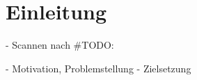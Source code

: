 
\section{Einleitung}\label{sec:Einleitung}

- Scannen nach \#TODO:

- Motivation, Problemstellung \newline
- Zielsetzung \newline
